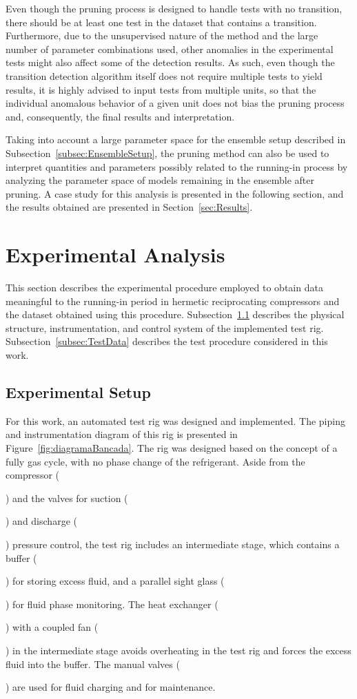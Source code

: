 \documentclass[preprint,11pt,number]{elsarticle}
\newcommand*\circled[1]{\begin{small}\tikz[baseline=(char.base)]{           \node[shape=circle,draw,minimum width=1.3em,inner sep=0.5pt] (char) {#1};}\end{small}}
\begin{document}
Even though the pruning process is designed to handle tests with no transition, there should be at least one test in the dataset that contains a transition. Furthermore, due to the unsupervised nature of the method and the large number of parameter combinations used, other anomalies in the experimental tests might also affect some of the detection results. As such, even though the transition detection algorithm itself does not require multiple tests to yield results, it is highly advised to input tests from multiple units, so that the individual anomalous behavior of a given unit does not bias the pruning process and, consequently, the final results and interpretation.

Taking into account a large parameter space for the ensemble setup described in Subsection~\ref{subsec:EnsembleSetup}, the pruning method can also be used to interpret quantities and parameters possibly related to the running-in process by analyzing the parameter space of models remaining in the ensemble after pruning. A case study for this analysis is presented in the following section, and the results obtained are presented in Section~\ref{sec:Results}.

\section{Experimental Analysis}\label{sec:ExperimentalAnalysis}

This section describes the experimental procedure employed to obtain data meaningful to the running-in period in hermetic reciprocating compressors and the dataset obtained using this procedure. Subsection~\ref{subsec:ExperimentalSetup} describes the physical structure, instrumentation, and control system of the implemented test rig. Subsection~\ref{subsec:TestData} describes the test procedure considered in this work.

\subsection{Experimental Setup}\label{subsec:ExperimentalSetup}

For this work, an automated test rig was designed and implemented. The piping and instrumentation diagram of this rig is presented in Figure~\ref{fig:diagramaBancada}. The rig was designed based on the concept of a fully gas cycle, with no phase change of the refrigerant. Aside from the compressor (\circled{1}) and the valves for suction (\circled{2}) and discharge (\circled{3}) pressure control, the test rig includes an intermediate stage, which contains a buffer (\circled{4}) for storing excess fluid, and a parallel sight glass (\circled{5}) for fluid phase monitoring. The heat exchanger (\circled{6}) with a coupled fan (\circled{7}) in the intermediate stage avoids overheating in the test rig and forces the excess fluid into the buffer. The manual valves (\circled{8}) are used for fluid charging and for maintenance.
\end{document}
